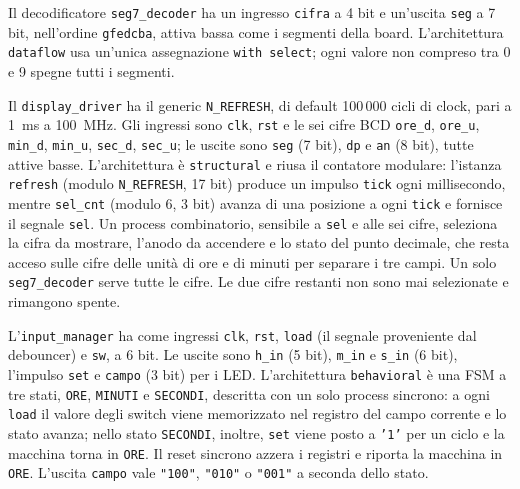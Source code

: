 
Il decodificatore \texttt{seg7\_decoder} ha un ingresso \texttt{cifra} a 4 bit e un'uscita \texttt{seg} a 7 bit, nell'ordine \texttt{gfedcba}, attiva bassa come i segmenti della board. L'architettura \texttt{dataflow} usa un'unica assegnazione \texttt{with select}; ogni valore non compreso tra 0 e 9 spegne tutti i segmenti.


Il \texttt{display\_driver} ha il generic \texttt{N\_REFRESH}, di default 100\,000 cicli di clock, pari a \SI{1}{ms} a \SI{100}{MHz}. Gli ingressi sono \texttt{clk}, \texttt{rst} e le sei cifre BCD \texttt{ore\_d}, \texttt{ore\_u}, \texttt{min\_d}, \texttt{min\_u}, \texttt{sec\_d}, \texttt{sec\_u}; le uscite sono \texttt{seg} (7 bit), \texttt{dp} e \texttt{an} (8 bit), tutte attive basse. L'architettura è \texttt{structural} e riusa il contatore modulare: l'istanza \texttt{refresh} (modulo \texttt{N\_REFRESH}, 17 bit) produce un impulso \texttt{tick} ogni millisecondo, mentre \texttt{sel\_cnt} (modulo 6, 3 bit) avanza di una posizione a ogni \texttt{tick} e fornisce il segnale \texttt{sel}. Un process combinatorio, sensibile a \texttt{sel} e alle sei cifre, seleziona la cifra da mostrare, l'anodo da accendere e lo stato del punto decimale, che resta acceso sulle cifre delle unità di ore e di minuti per separare i tre campi. Un solo \texttt{seg7\_decoder} serve tutte le cifre. Le due cifre restanti non sono mai selezionate e rimangono spente.


L'\texttt{input\_manager} ha come ingressi \texttt{clk}, \texttt{rst}, \texttt{load} (il segnale proveniente dal debouncer) e \texttt{sw}, a 6 bit. Le uscite sono \texttt{h\_in} (5 bit), \texttt{m\_in} e \texttt{s\_in} (6 bit), l'impulso \texttt{set} e \texttt{campo} (3 bit) per i LED. L'architettura \texttt{behavioral} è una FSM a tre stati, \texttt{ORE}, \texttt{MINUTI} e \texttt{SECONDI}, descritta con un solo process sincrono: a ogni \texttt{load} il valore degli switch viene memorizzato nel registro del campo corrente e lo stato avanza; nello stato \texttt{SECONDI}, inoltre, \texttt{set} viene posto a \texttt{'1'} per un ciclo e la macchina torna in \texttt{ORE}. Il reset sincrono azzera i registri e riporta la macchina in \texttt{ORE}. L'uscita \texttt{campo} vale \texttt{"100"}, \texttt{"010"} o \texttt{"001"} a seconda dello stato.

